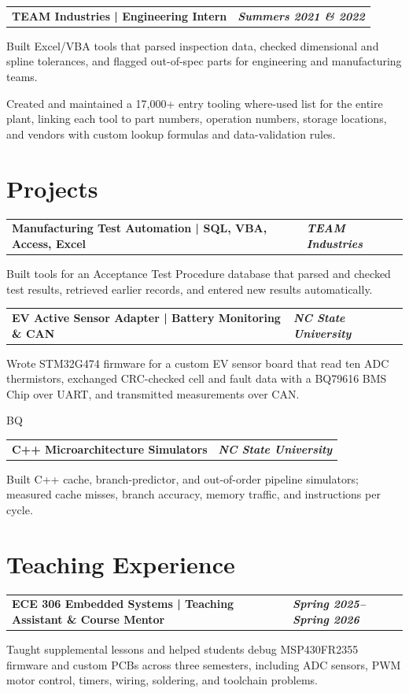 \documentclass[10pt,letterpaper]{article}
\makeatletter
\newcommand{\resumeentry}[2]{%
  \begin{tabularx}{\textwidth}{@{}X>{\raggedleft\arraybackslash}p{2.40in}@{}}
    \textbf{#1} & \textbf{\textit{#2}}
  \end{tabularx}\vspace{-0.075cm}
}
\makeatother
\begin{document}
\resumeentry{TEAM Industries | Engineering Intern}{Summers 2021 \& 2022}
\begin{resumebullets}
  \item Built Excel/VBA tools that parsed inspection data, checked dimensional and spline tolerances, and flagged out-of-spec parts for engineering and manufacturing teams.
  \item Created and maintained a 17,000+ entry tooling where-used list for the entire plant, linking each tool to part numbers, operation numbers, storage locations, and vendors with custom lookup formulas and data-validation rules.
\end{resumebullets}

\section{Projects}
\resumeentry{Manufacturing Test Automation | SQL, VBA, Access, Excel}{TEAM Industries}
\begin{resumebullets}
  \item Built tools for an Acceptance Test Procedure database that parsed and checked test results, retrieved earlier records, and entered new results automatically.
\end{resumebullets}

\resumeentry{EV Active Sensor Adapter | Battery Monitoring \& CAN}{NC State University}
\begin{resumebullets}
  \item Wrote STM32G474 firmware for a custom EV sensor board that read ten ADC thermistors, exchanged CRC-checked cell and fault data with a BQ79616 BMS Chip over UART, and transmitted measurements over CAN.
\end{resumebullets}
BQ
\resumeentry{C++ Microarchitecture Simulators}{NC State University}
\begin{resumebullets}
  \item Built C++ cache, branch-predictor, and out-of-order pipeline simulators; measured cache misses, branch accuracy, memory traffic, and instructions per cycle.
\end{resumebullets}

\section{Teaching Experience}
\resumeentry{ECE 306 Embedded Systems | Teaching Assistant \& Course Mentor}{Spring 2025--Spring 2026}
\begin{resumebullets}
  \item Taught supplemental lessons and helped students debug MSP430FR2355 firmware and custom PCBs across three semesters, including ADC sensors, PWM motor control, timers, wiring, soldering, and toolchain problems.
\end{resumebullets}
\end{document}
